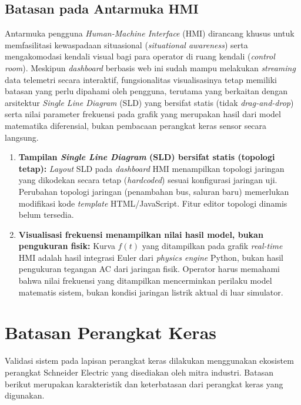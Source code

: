 \subsection{Batasan pada Antarmuka HMI}
\label{subsec:Batasan_pada_Antarmuka_HMI}

Antarmuka pengguna \textit{Human-Machine Interface} (HMI) dirancang khusus untuk memfasilitasi kewaspadaan situasional (\textit{situational awareness}) serta mengakomodasi kendali visual bagi para operator di ruang kendali (\textit{control room}). Meskipun \textit{dashboard} berbasis web ini sudah mampu melakukan \textit{streaming} data telemetri secara interaktif, fungsionalitas visualisasinya tetap memiliki batasan yang perlu dipahami oleh pengguna, terutama yang berkaitan dengan arsitektur \textit{Single Line Diagram} (SLD) yang bersifat statis (tidak \textit{drag-and-drop}) serta nilai parameter frekuensi pada grafik yang merupakan hasil dari model matematika diferensial, bukan pembacaan perangkat keras sensor secara langsung.

\begin{enumerate}
    \item[a.] \textbf{Tampilan \textit{Single Line Diagram} (SLD) bersifat statis (topologi tetap):} \textit{Layout} SLD pada \textit{dashboard} HMI menampilkan topologi jaringan yang dikodekan secara tetap (\textit{hardcoded}) sesuai konfigurasi jaringan uji. Perubahan topologi jaringan (penambahan bus, saluran baru) memerlukan modifikasi kode \textit{template} HTML/JavaScript. Fitur editor topologi dinamis belum tersedia.
    
    \item[b.] \textbf{Visualisasi frekuensi menampilkan nilai hasil model, bukan pengukuran fisik:} Kurva $f(t)$ yang ditampilkan pada grafik \textit{real-time} HMI adalah hasil integrasi Euler dari \textit{physics engine} Python, bukan hasil pengukuran tegangan AC dari jaringan fisik. Operator harus memahami bahwa nilai frekuensi yang ditampilkan mencerminkan perilaku model matematis sistem, bukan kondisi jaringan listrik aktual di luar simulator.
\end{enumerate}

\section{Batasan Perangkat Keras}
\label{sec:Batasan_Perangkat_Keras}

Validasi sistem pada lapisan perangkat keras dilakukan menggunakan ekosistem perangkat Schneider Electric yang disediakan oleh mitra industri. Batasan berikut merupakan karakteristik dan keterbatasan dari perangkat keras yang digunakan.

